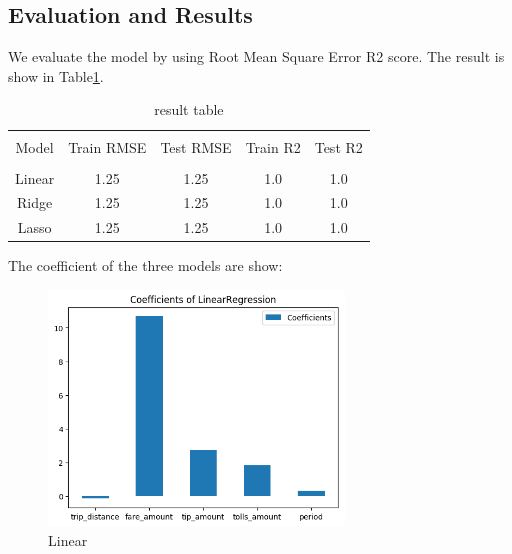 \documentclass[11pt]{article}
\begin{document}
\subsection{Evaluation and Results}

We evaluate the model by using Root Mean Square Error R2 score. The result is show in Table\ref{table1}.

\begin{table}[h]
    \centering  
    \caption{result table}  
    \label{table1} 
    \begin{tabular}{|c|c|c|c|c|}  
        \hline  %
        & & & & \\[-6pt]  %
        Model&Train RMSE&Test RMSE&Train R2&Test R2 \\  %
        \hline
        & & & & \\[-6pt]  %
        Linear&1.25&1.25&1.0& 1.0 \\
        Ridge&1.25&1.25&1.0& 1.0 \\
        Lasso&1.25&1.25&1.0& 1.0 \\
        \hline
    \end{tabular}
\end{table}

The coefficient of the three models are show:

\begin{figure}[!h]
    \centering
    \includegraphics[width=0.7\textwidth]{plots/p11.png}
    \caption{Linear} %
    \label{fig:image4}
\end{figure}
\end{document}
